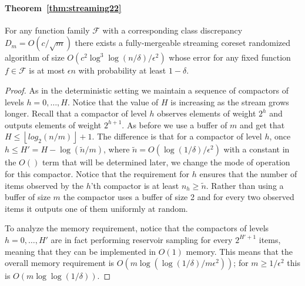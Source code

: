 \documentclass[12pt]{colt2019} %
\newcommand{\eps}{\epsilon}
\newcommand{\F}{\mathcal{F}}
\newcommand{\floor}[1]{\left \lfloor #1 \right \rfloor}
\begin{document}
{\paragraph{Theorem~\ref{thm:streaming22}}
For any function family $\F$ with a corresponding class discrepancy $D_m = O(c/\sqrt{m})$ there exists a fully-mergeable streaming coreset randomized algorithm of size $O\left(c^2\log^3\log(n/\delta) /\eps^2\right)$ whose error for any fixed function $f \in \F$ is at most $\eps n$ with probability at least $1-\delta$. 
\begin{proof}
As in the deterministic setting we maintain a sequence of compactors of levels $h=0,\ldots,H$. Notice that the value of $H$ is increasing as the stream grows longer. Recall that a compactor of level $h$ observes elements of weight $2^h$ and outputs elements of weight $2^{h+1}$. As before we use a buffer of $m$ and get that $H \leq  \floor{log_2(n/m)}+1$.
The difference is that for a compactor of level $h$, once $h \leq H' = H - \log(\tilde{n}/m)$, where $\tilde{n} = O(\log(1/\delta)/\eps^2)$ with a constant in the $O()$ term that will be determined later, we change the mode of operation for this compactor. Notice that the requirement for $h$ ensures that the number of items observed by the $h$'th compactor is at least $n_h \geq \tilde{n}$. Rather than using a buffer of size $m$ the compactor uses a buffer of size 2 and for every two observed items it outputs one of them uniformly at random.

To analyze the memory requirement, notice that the compactors of levels $h=0,\ldots,H'$ are in fact performing reservoir sampling for every $2^{H'+1}$ items, meaning that they can be implemented in $O(1)$ memory. This means that the overall memory requirement is $O(m\log(\log(1/\delta)/m\eps^2))$; for $m \geq 1/\eps^2$ this is $O(m\log\log(1/\delta))$. 


\end{proof}}
\end{document}
